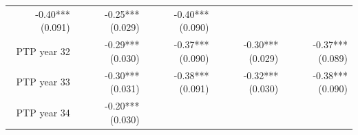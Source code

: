 \documentclass[]{article}
\begin{document}
\begin{longtable}[c]{@{}rrrrr@{}}
\begin{minipage}[t]{0.16\columnwidth}
-0.40*** (0.091)
\strut\end{minipage} &
\begin{minipage}[t]{0.21\columnwidth}\raggedleft\strut
-0.25*** (0.029)
\strut\end{minipage} &
\begin{minipage}[t]{0.15\columnwidth}\raggedleft\strut
-0.40*** (0.090)
\strut\end{minipage}\tabularnewline
\begin{minipage}[t]{0.17\columnwidth}\raggedleft\strut
PTP year 32
\strut\end{minipage} &
\begin{minipage}[t]{0.18\columnwidth}\raggedleft\strut
-0.29*** (0.030)
\strut\end{minipage} &
\begin{minipage}[t]{0.16\columnwidth}\raggedleft\strut
-0.37*** (0.090)
\strut\end{minipage} &
\begin{minipage}[t]{0.21\columnwidth}\raggedleft\strut
-0.30*** (0.029)
\strut\end{minipage} &
\begin{minipage}[t]{0.15\columnwidth}\raggedleft\strut
-0.37*** (0.089)
\strut\end{minipage}\tabularnewline
\begin{minipage}[t]{0.17\columnwidth}\raggedleft\strut
PTP year 33
\strut\end{minipage} &
\begin{minipage}[t]{0.18\columnwidth}\raggedleft\strut
-0.30*** (0.031)
\strut\end{minipage} &
\begin{minipage}[t]{0.16\columnwidth}\raggedleft\strut
-0.38*** (0.091)
\strut\end{minipage} &
\begin{minipage}[t]{0.21\columnwidth}\raggedleft\strut
-0.32*** (0.030)
\strut\end{minipage} &
\begin{minipage}[t]{0.15\columnwidth}\raggedleft\strut
-0.38*** (0.090)
\strut\end{minipage}\tabularnewline
\begin{minipage}[t]{0.17\columnwidth}\raggedleft\strut
PTP year 34
\strut\end{minipage} &
\begin{minipage}[t]{0.18\columnwidth}\raggedleft\strut
-0.20*** (0.030)
\strut\end{minipage} &
\begin{minipage}[t]{0.16\columnwidth}\raggedleft\strut

\end{minipage}
\end{longtable}
\end{document}
